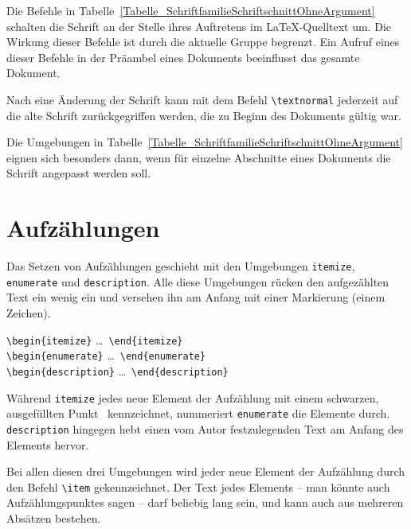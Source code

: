 Die Befehle in Tabelle~\ref{Tabelle_SchriftfamilieSchriftschnittOhneArgument} schalten die Schrift an der Stelle 
ihres Auftretens im \LaTeX-Quelltext um. 
Die Wirkung dieser Befehle ist durch die aktuelle Gruppe
begrenzt. Ein Aufruf eines dieser Befehle in der Präambel eines Dokuments
beeinflusst das gesamte Dokument. 

Nach eine Änderung der Schrift kann mit dem Befehl \verb!\textnormal! 
jederzeit auf die alte Schrift zurückgegriffen werden, die zu Beginn des Dokuments gültig war. 


Die Umgebungen in Tabelle~\ref{Tabelle_SchriftfamilieSchriftschnittOhneArgument} eignen sich besonders dann, wenn für einzelne Abschnitte eines Dokuments die Schrift angepasst werden soll. 

\section{Aufzählungen}
\label{Abschnitt_Aufzaehlungen}

Das Setzen von Aufzählungen geschieht mit den Umgebungen 
\verb!itemize!, 
\verb!enumerate! und 
\verb!description!. Alle
diese Umgebungen rücken den aufgezählten Text ein wenig ein und versehen ihn am Anfang mit einer Markierung (einem Zeichen).

\begin{boxedminipage}{\textwidth}
	\texttt{\textbackslash begin\{itemize\}} \enskip \dots\ \enskip \texttt{\textbackslash end\{itemize\}} \\
	\texttt{\textbackslash begin\{enumerate\}} \enskip \dots\ \enskip \texttt{\textbackslash end\{enumerate\}} \\
	\texttt{\textbackslash begin\{description\}} \enskip \dots\ \enskip \texttt{\textbackslash end\{description\}}
\end{boxedminipage}

Während \verb!itemize! jedes neue Element der Aufzählung mit einem schwarzen,
ausgefüllten Punkt \textbullet\ kennzeichnet, nummeriert \verb!enumerate! die 
Elemente durch. \verb!description! hingegen hebt einen vom Autor festzulegenden 
Text am Anfang des Elements hervor.

Bei allen diesen drei Umgebungen wird jeder neue Element der Aufzählung durch
den Befehl \verb!\item! gekennzeichnet. Der Text jedes Elements -- man könnte auch Aufzählungspunktes sagen -- darf beliebig lang sein, und kann auch aus
mehreren Absätzen bestehen. 

